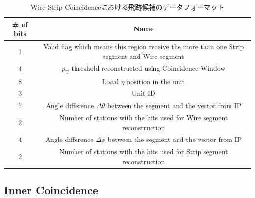 \begin{table}[]
    \centering
    \caption{Wire Strip Coincidenceにおける飛跡候補のデータフォーマット}
    \label{tab:WS}
    \begin{tabular}{|c|c|}
    \hline
    \# of bits & Name                                                                                        \\ \hline\hline
    1          & Valid flag which means this region receive the more than one Strip segment and Wire segment \\ \hline
    4          & $p_{\mathrm{T}}$ threshold reconstructed using Coincidence Window                           \\ \hline
    8          & Local $\eta$ position in the unit                                                           \\ \hline
    3          & Unit ID                                                                                     \\ \hline
    7          & Angle difference $\Delta\theta$ between the segment and the vector from IP                    \\ \hline
    2          & Number of stations with the hits used for Wire segment reconstruction                       \\ \hline
    4          & Angle difference $\Delta\phi$ between the segment and the vector from IP                    \\ \hline
    2          & Number of stations with the hits used for Strip segment reconstruction                      \\ \hline
    \end{tabular}
\end{table}

\subsection{Inner Coincidence}
